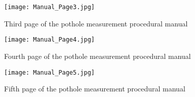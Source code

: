 \begin{figure}[htbp]
	\centering
	\texttt{[image: Manual\_Page3.jpg]}
	\caption{Third page of the pothole measurement procedural manual}
	\label{fig:manual_page3}
\end{figure}

\begin{figure}[htbp]
	\centering
	\texttt{[image: Manual\_Page4.jpg]}
	\caption{Fourth page of the pothole measurement procedural manual}
	\label{fig:manual_page4}
\end{figure}

\begin{figure}[htbp]
	\centering
	\texttt{[image: Manual\_Page5.jpg]}
	\caption{Fifth page of the pothole measurement procedural manual}
	\label{fig:manual_page5}
\end{figure}


